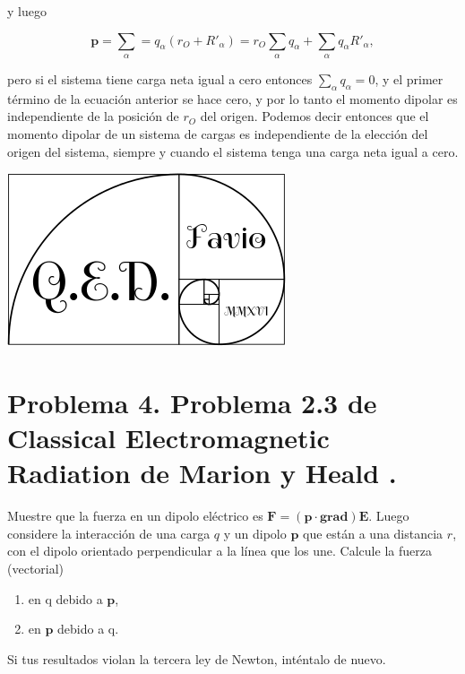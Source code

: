 \documentclass[a4paper,11pt]{article}
\numberwithin{equation}{section}
\begin{document}
y luego 

\begin{equation}
 \mathbf{p} = \sum_\alpha = q_\alpha(r_O + R'_\alpha) = r_O \sum_\alpha q_\alpha + 
 \sum_\alpha q_\alpha R'_\alpha,
\end{equation}

pero si el sistema tiene carga neta igual a cero entonces $\sum_\alpha q_\alpha = 0$, y 
el primer término de la ecuación anterior se hace cero, y por lo tanto el momento 
dipolar es independiente de la posición de $r_O$ del origen. Podemos decir 
entonces que el momento dipolar de un sistema de cargas es independiente de la elección
del origen del sistema, siempre y cuando el sistema tenga una carga neta igual a 
cero.

\hspace{10cm}\includegraphics[scale=0.25]{logoQED}

\section{Problema 4. Problema 2.3 de Classical Electromagnetic Radiation
de Marion y Heald \cite{marion2}.}

Muestre que la fuerza en un dipolo eléctrico es $\mathbf{F} = (\mathbf{p}\cdot 
\mathbf{grad})\mathbf{E}$. Luego considere la interacción de una carga $q$ y un dipolo 
$\mathbf{p}$ que están a una distancia $r$, con el dipolo orientado perpendicular a 
la línea que los une. Calcule la fuerza (vectorial)

\begin{enumerate}[label=\textbf{(\alph*)}]
\item en q debido a $\mathbf{p}$, 
\item en $\mathbf{p}$ debido a q.
\end{enumerate}

Si tus resultados violan la tercera ley de Newton, inténtalo de nuevo.

\vspace{.3cm}
\end{document}
